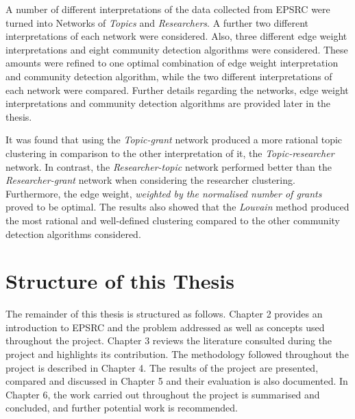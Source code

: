 A number of different interpretations of the data collected from EPSRC were turned into Networks of \textit{Topics} and \textit{Researchers}. A further two different interpretations of each network were considered. Also, three different edge weight interpretations and eight community detection algorithms were considered. These amounts were refined to one optimal combination of edge weight interpretation and community detection algorithm, while the two different interpretations of each network were compared. Further details regarding the networks, edge weight interpretations and community detection algorithms are provided later in the thesis.

It was found that using the \textit{Topic-grant} network produced a more rational topic clustering in comparison to the other interpretation of it, the \textit{Topic-researcher} network. In contrast, the \textit{Researcher-topic} network performed better than the \textit{Researcher-grant} network when considering the researcher clustering. Furthermore, the edge weight, \textit{weighted by the normalised number of grants} proved to be optimal. The results also showed that the \textit{Louvain} method produced the most rational and well-defined clustering compared to the other community detection algorithms considered.

\section{Structure of this Thesis}

The remainder of this thesis is structured as follows. Chapter 2 provides an introduction to EPSRC and the problem addressed as well as concepts used throughout the project. Chapter 3 reviews the literature consulted during the project and highlights its contribution. The methodology followed throughout the project is described in Chapter 4. The results of the project are presented, compared and discussed in Chapter 5 and their evaluation is also documented. In Chapter 6, the work carried out throughout the project is summarised and concluded, and further potential work is recommended.